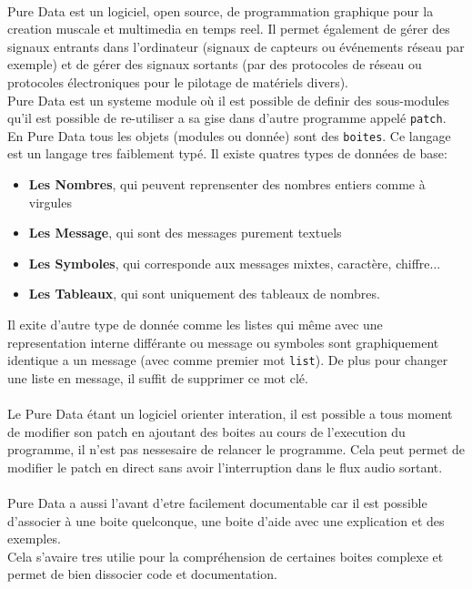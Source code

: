 \documentclass[a4paper, titlepage, oneside, 12pt]{article}%
\begin{document}
\paragraph{}
Pure Data est un logiciel, open source, de programmation graphique pour la creation muscale et multimedia en temps reel. Il permet également de gérer des signaux entrants dans l'ordinateur (signaux de capteurs ou événements réseau par exemple) et de gérer des signaux sortants (par des protocoles de réseau ou protocoles électroniques pour le pilotage de matériels divers).\\
Pure Data est un systeme module où il est possible de definir des sous-modules qu'il est possible de re-utiliser a sa gise dans d'autre programme appelé \texttt{patch}.
En Pure Data tous les objets (modules ou donnée) sont des \texttt{boites}.
Ce langage est un langage tres faiblement typé. Il existe quatres types de données de base:\\
\begin{itemize}
\item \textbf{Les Nombres}, qui peuvent reprensenter des nombres entiers comme à virgules
\item \textbf{Les Message}, qui sont des messages purement textuels 
\item \textbf{Les Symboles}, qui corresponde aux messages mixtes, caractère, chiffre...
\item \textbf{Les Tableaux}, qui sont uniquement des tableaux de nombres.
\end{itemize}
Il exite d'autre type de donnée comme les listes qui même avec une representation interne différante ou message ou symboles sont graphiquement identique a un message (avec comme premier mot \texttt{list}). De plus pour changer une liste en message, il suffit de supprimer ce mot clé.

\paragraph{}
Le Pure Data étant un logiciel orienter interation, il est possible a tous moment de modifier son patch en ajoutant des boites au cours de l'execution du programme, il n'est pas nessesaire de relancer le programme. Cela peut permet de modifier le patch en direct sans avoir l’interruption dans le flux audio sortant.

\paragraph{}
Pure Data a aussi l'avant d'etre facilement documentable car il est possible d'associer à une boite quelconque, une boite d'aide avec une explication et des exemples.\\
Cela s'avaire tres utilie pour la compréhension de certaines boites complexe et permet de bien dissocier code et documentation.
\end{document}
